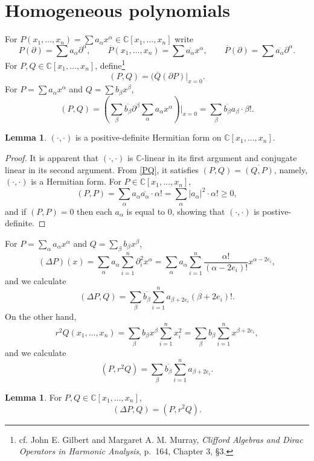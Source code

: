 \documentclass{article}
\theoremstyle{definition}
\newtheorem{lemma}[theorem]{Lemma}
\theoremstyle{definition}
\begin{document}
\section{Homogeneous polynomials}
For $P(x_1,\ldots,x_n) = \sum a_\alpha x^\alpha \in \mathbb{C}[x_1,\ldots,x_n]$ write
\[
P(\partial) = \sum a_\alpha \partial^\alpha,\qquad \overline{P}(x_1,\ldots,x_n) = \sum \overline{a_\alpha} x^\alpha,
\qquad \overline{P}(\partial) = \sum \overline{a_\alpha} \partial^\alpha.
\]
For $P,Q \in \mathbb{C}[x_1,\ldots,x_n]$, define\footnote{cf. 
John E. Gilbert and Margaret A. M. Murray, 
{\em Clifford Algebras and Dirac Operators in Harmonic Analysis},
p.~164, Chapter 3, \S 3.}
\[
(P,Q) = (\overline{Q}(\partial P) \Big|_{x=0}.
\]
For $P=\sum a_\alpha x^\alpha$ and $Q=\sum b_\beta x^\beta$,
\begin{equation}
(P,Q)=
\left( \sum_\beta \overline{b_\beta} \partial^\beta \sum_\alpha a_\alpha x^\alpha\right) \Big|_{x=0}
=\sum_\beta \overline{b_\beta} a_\beta \cdot \beta!.
\label{PQ}
\end{equation}

\begin{lemma}
$(\cdot,\cdot)$ is a positive-definite Hermitian form on $\mathbb{C}[x_1,\ldots,x_n]$.
\end{lemma}
\begin{proof}
It is apparent that $(\cdot,\cdot)$ is $\mathbb{C}$-linear in its first argument and conjugate linear in its
second argument. From \eqref{PQ}, it satisfies $(P,Q)=\overline{(Q,P)}$, namely, $(\cdot,\cdot)$ is a 
Hermitian form.
For $P \in \mathbb{C}[x_1,\ldots,x_n]$,
\[
(P,P) = \sum_\alpha a_\alpha \overline{a_\alpha} \cdot \alpha! = \sum_\alpha |a_\alpha|^2 \cdot \alpha!
\geq 0,
\]
and if $(P,P)=0$ then each $a_\alpha$ is equal to $0$, showing that $(\cdot,\cdot)$ is postive-definite.
\end{proof}

For $P=\sum_\alpha a_\alpha x^\alpha$ and $Q=\sum_\beta b_\beta x^\beta$,
\[
(\Delta P)(x)=\sum_\alpha a_\alpha \sum_{i=1}^n \partial_i^2 x^\alpha
=\sum_\alpha a_\alpha \sum_{i=1}^n \frac{\alpha!}{(\alpha-2e_i)!} x^{\alpha-2e_i},
\]
and we calculate
\[
(\Delta P,Q) = \sum_{\beta} \overline{b_\beta} \sum_{i=1}^n a_{\beta+2e_i} (\beta+2e_i)!.
\]
On the other hand,
\[
r^2Q(x_1,\ldots,x_n) = \sum_\beta b_\beta x^\beta \sum_{i=1}^n x_i^2
= \sum_\beta b_\beta \sum_{i=1}^n x^{\beta+2e_i},
\]
and we calculate
\[
(P,r^2Q)=\sum_\beta \overline{b_\beta} \sum_{i=1}^n a_{\beta+2e_i}.
\]

\begin{lemma}
For $P,Q \in \mathbb{C}[x_1,\ldots,x_n]$, 
\[
(\Delta P,Q) = (P,r^2Q).
\]
\label{rQ}
\end{lemma}
\end{document}
